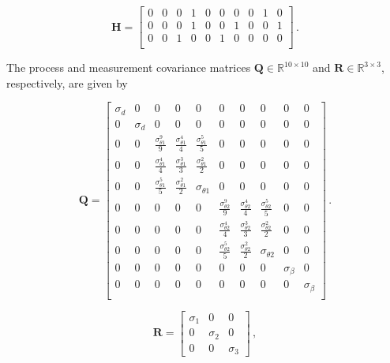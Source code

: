 \begin{equation}
\mathbf{H} = \begin{bmatrix}
  0 & 0 & 0 & 1 & 0 & 0 & 0 & 0 & 1 & 0\\
  0 & 0 & 0 & 1 & 0 & 0 & 1 & 0 & 0 & 1\\
  0 & 0 & 1 & 0 & 0 & 1 & 0 & 0 & 0 & 0\\
\end{bmatrix}\,.
\end{equation}

The process and measurement covariance matrices $\mathbf{Q} \in \mathbb{R}^{10 \times 10}$ and $\mathbf{R} \in \mathbb{R}^{3 \times 3}$, respectively, are given by

\begin{equation}
\mathbf{Q} = \begin{bmatrix}
  \sigma_d & 0 & 0 & 0 & 0 & 0 & 0 & 0 & 0 & 0\\
  0 & \sigma_d & 0 & 0 & 0 & 0 & 0 & 0 & 0 & 0\\
  0 & 0 & \frac{\sigma^9_{\theta 1}}{9} & \frac{\sigma^4_{\theta 1}}{4} & \frac{\sigma^5_{\theta 1}}{5} & 0 & 0 & 0 & 0 & 0\\
  0 & 0 & \frac{\sigma^4_{\theta 1}}{4} & \frac{\sigma^3_{\theta 1}}{3} & \frac{\sigma^2_{\theta 1}}{2} & 0 & 0 & 0 & 0 & 0\\
  0 & 0 & \frac{\sigma^5_{\theta 1}}{5} & \frac{\sigma^2_{\theta 1}}{2} & \sigma_{\theta 1} & 0 & 0 & 0 & 0 & 0\\
  0 & 0 & 0 & 0 & 0 & \frac{\sigma^9_{\theta 2}}{9} & \frac{\sigma^4_{\theta 2}}{4} & \frac{\sigma^5_{\theta 2}}{5} & 0 & 0\\
  0 & 0 & 0 & 0 & 0 & \frac{\sigma^4_{\theta 2}}{4} & \frac{\sigma^3_{\theta 2}}{3} & \frac{\sigma^2_{\theta 2}}{2} & 0 & 0\\
  0 & 0 & 0 & 0 & 0 & \frac{\sigma^5_{\theta 2}}{5} & \frac{\sigma^2_{\theta 2}}{2} & \sigma_{\theta 2} & 0 & 0\\
  0 & 0 & 0 & 0 & 0 & 0 & 0 & 0 & \sigma_{\beta} & 0\\
  0 & 0 & 0 & 0 & 0 & 0 & 0 & 0 & 0 & \sigma_{\beta}\\
\end{bmatrix}\,.
\end{equation}

\begin{equation}
\mathbf{R} = \begin{bmatrix}
  \sigma_1 & 0 & 0\\
  0 & \sigma_2 & 0\\
  0 & 0 & \sigma_3
\end{bmatrix}\,,
\end{equation}

